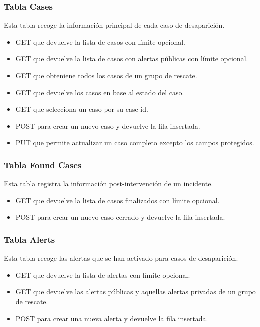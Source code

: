     \subsubsection{Tabla Cases}
        Esta tabla recoge la información principal de cada caso de desaparición.
        \begin{itemize}
            \item GET que devuelve la lista de casos con límite opcional.
            \item GET que devuelve la lista de casos con alertas públicas con límite opcional.
            \item GET que obteniene todos los casos de un grupo de rescate.
            \item GET que devuelve los casos en base al estado del caso.
            \item GET que selecciona un caso por su case id.
            \item POST para crear un nuevo caso y devuelve la fila insertada.
            \item PUT que permite actualizar un caso completo excepto los campos protegidos.
        \end{itemize}

    \subsubsection{Tabla Found Cases}
        Esta tabla registra la información post-intervención de un incidente.
        \begin{itemize}
            \item GET que devuelve la lista de casos finalizados con límite opcional.
            \item POST para crear un nuevo caso cerrado y devuelve la fila insertada.
        \end{itemize}

    \subsubsection{Tabla Alerts}
        Esta tabla recoge las alertas que se han activado para casos de desaparición.
        \begin{itemize}
            \item GET que devuelve la lista de alertas con límite opcional.
            \item GET que devuelve las alertas públicas y aquellas alertas privadas de un grupo de rescate.
            \item POST para crear una nueva alerta y devuelve la fila insertada.  
        \end{itemize}
        
